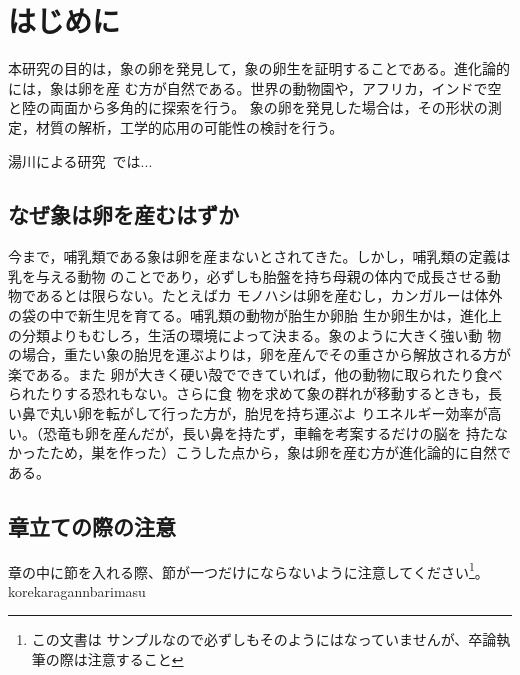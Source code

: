 \chapter{はじめに}
本研究の目的は，象の卵を発見して，象の卵生を証明することである。進化論的には，象は卵を産
む方が自然である。世界の動物園や，アフリカ，インドで空と陸の両面から多角的に探索を行う。
象の卵を発見した場合は，その形状の測定，材質の解析，工学的応用の可能性の検討を行う。

湯川による研究~\cite{yukawa1950quantum}では...

\section{なぜ象は卵を産むはずか}
今まで，哺乳類である象は卵を産まないとされてきた。しかし，哺乳類の定義は乳を与える動物
のことであり，必ずしも胎盤を持ち母親の体内で成長させる動物であるとは限らない。たとえばカ
モノハシは卵を産むし，カンガルーは体外の袋の中で新生児を育てる。哺乳類の動物が胎生か卵胎
生か卵生かは，進化上の分類よりもむしろ，生活の環境によって決まる。象のように大きく強い動
物の場合，重たい象の胎児を運ぶよりは，卵を産んでその重さから解放される方が楽である。また
卵が大きく硬い殻でできていれば，他の動物に取られたり食べられたりする恐れもない。さらに食
物を求めて象の群れが移動するときも，長い鼻で丸い卵を転がして行った方が，胎児を持ち運ぶよ
りエネルギー効率が高い。（恐竜も卵を産んだが，長い鼻を持たず，車輪を考案するだけの脳を
持たなかったため，巣を作った）こうした点から，象は卵を産む方が進化論的に自然である。

\section{章立ての際の注意}
章の中に節を入れる際、節が一つだけにならないように注意してください\footnote{この文書は
サンプルなので必ずしもそのようにはなっていませんが、卒論執筆の際は注意すること}。
korekaragannbarimasu
